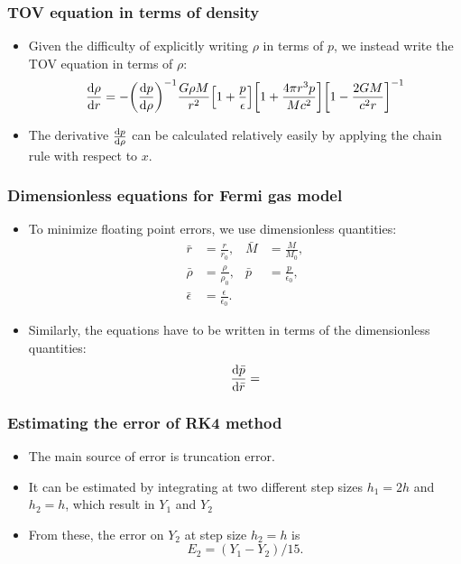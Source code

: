 \documentclass[hperref={pdfpagelabels=false}]{beamer}
\begin{document}
\begin{frame}
    \frametitle{TOV equation in terms of density}
    \begin{itemize}
        \item Given the difficulty of explicitly writing $\rho$ in terms of $p$, we instead write the TOV equation in terms of $\rho$: \[\dv{\rho}{r}=-\qty(\dv{p}{\rho})^{-1}\frac{G\rho M}{r^{2}}\qty[1+\frac{p}{\epsilon}]\qty[1+\frac{4\pi r^{3}p}{Mc^{2}}]\qty[1-\frac{2GM}{c^{2}r}]^{-1}\]
        \item The derivative $\dv{p}{\rho}$ can be calculated relatively easily by applying the chain rule with respect to $x$.
    \end{itemize}
\end{frame}

\begin{frame}
    \frametitle{Dimensionless equations for Fermi gas model}
    \begin{itemize}
        \item To minimize floating point errors, we use dimensionless quantities:
            \begin{align*}
                \bar{r}&=\frac{r}{r_{0}},&\bar{M}&=\frac{M}{M_{0}},\\
                \bar{\rho}&=\frac{\rho}{\rho_{0}},&\bar{p}&=\frac{p}{\epsilon_{0}},\\
                \bar{\epsilon}&=\frac{\epsilon}{\epsilon_{0}}.
            \end{align*}
        \item Similarly, the equations have to be written in terms of the dimensionless quantities:
            \begin{align*}
                \dv{\bar{p}}{\bar{r}}=
            \end{align*}
    \end{itemize}
\end{frame}

\begin{frame}
    \frametitle{Estimating the error of RK4 method}
    \begin{itemize}
     \item The main source of error is truncation error.
    \end{itemize}
    \begin{itemize}
     \item It can be estimated by integrating at two different step sizes $h_{1}=2h$ and $h_{2}=h$, which result in $Y_{1}$ and $Y_{2}$
    \end{itemize}
    \begin{itemize}
     \item From these, the error on $Y_{2}$ at step size $h_{2}=h$ is \[E_{2}=(Y_{1}-Y_{2})/15.\]
    \end{itemize}
\end{frame}
\end{document}
